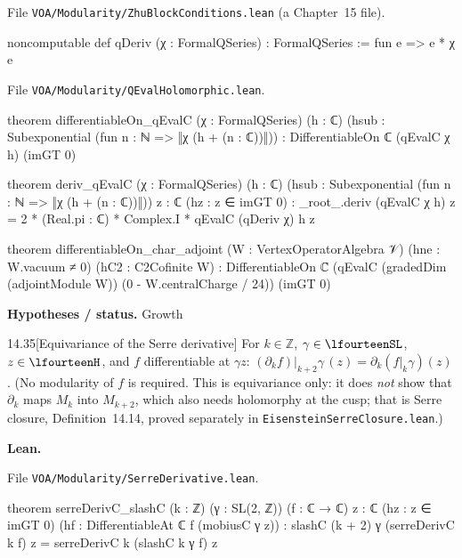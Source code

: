 \documentclass[11pt,openany]{book}
\newcommand{\lean}[1]{\texttt{\detokenize{#1}}}
\newcommand{\leanpath}[1]{\texttt{\small #1}}
\theoremstyle{definition}
\theoremstyle{plain}
\newcommand{\Z}{{\mathbb{Z}}}
\begin{document}
{\raggedright\noindent File \leanpath{VOA/\allowbreak Modularity/\allowbreak ZhuBlockConditions.lean} (a Chapter~15 file).\par}
\begin{leancode}
noncomputable def qDeriv (χ : FormalQSeries) : FormalQSeries := fun e => e * χ e
\end{leancode}
{\raggedright\noindent File \leanpath{VOA/\allowbreak Modularity/\allowbreak QEvalHolomorphic.lean}.\par}
\begin{leancode}
theorem differentiableOn_qEvalC (χ : FormalQSeries) (h : ℂ)
    (hsub : Subexponential (fun n : ℕ => ‖χ (h + (n : ℂ))‖)) :
    DifferentiableOn ℂ (qEvalC χ h) (imGT 0)

theorem deriv_qEvalC (χ : FormalQSeries) (h : ℂ)
    (hsub : Subexponential (fun n : ℕ => ‖χ (h + (n : ℂ))‖)) {z : ℂ} (hz : z ∈ imGT 0) :
    _root_.deriv (qEvalC χ h) z = 2 * (Real.pi : ℂ) * Complex.I * qEvalC (qDeriv χ) h z

theorem differentiableOn_char_adjoint (W : VertexOperatorAlgebra 𝒱) (hne : W.vacuum ≠ 0)
    (hC2 : C2Cofinite W) :
    DifferentiableOn ℂ
      (qEvalC (gradedDim (adjointModule W)) (0 - W.centralCharge / 24)) (imGT 0)
\end{leancode}
\noindent\textbf{Hypotheses / status.} Growth\par
\medskip
\begin{btheorem}{14.35}[Equivariance of the Serre derivative]
For $k\in\Z$, $\gamma\in\lfourteenSL$, $z\in\lfourteenH$, and $f$ differentiable at $\gamma z$:
$(\partial_kf)|_{k+2}\gamma\,(z) = \partial_k(f|_k\gamma)(z)$. (No modularity of $f$ is required. This is equivariance only:
it does \emph{not} show that $\partial_k$ maps $M_k$ into $M_{k+2}$, which also needs holomorphy at the cusp; that is
Serre closure, Definition~14.14, proved separately in \leanpath{EisensteinSerreClosure.lean}.)
\end{btheorem}
{\raggedright\noindent\textbf{Lean.} \lean{VOA.}\allowbreak\lean{serreDerivC_slashC}\par}
{\raggedright\noindent File \leanpath{VOA/\allowbreak Modularity/\allowbreak SerreDerivative.lean}.\par}
\begin{leancode}
theorem serreDerivC_slashC (k : ℤ) (γ : SL(2, ℤ)) (f : ℂ → ℂ) {z : ℂ} (hz : z ∈ imGT 0)
    (hf : DifferentiableAt ℂ f (mobiusC γ z)) :
    slashC (k + 2) γ (serreDerivC k f) z = serreDerivC k (slashC k γ f) z
\end{leancode}
\end{document}
